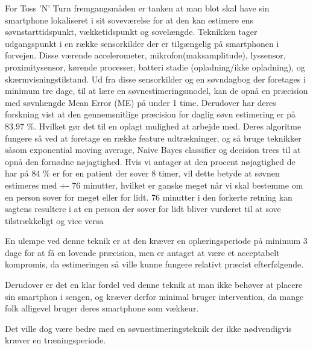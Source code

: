For Toss 'N' Turn fremgangsmåden er tanken at man blot skal have sin smartphone lokaliseret i sit soveværelse for at den kan estimere ens søvnstarttidspunkt, vækketidspunkt og sovelængde.
Teknikken tager udgangspunkt i en række sensorkilder der er tilgængelig på smartphonen i forvejen.
Disse værende accelerometer, mikrofon(maksamplitude), lyssensor, proximitysensor, kørende processer, batteri stadie (opladning/ikke opladning), og skærmvisningstilstand.
Ud fra disse sensorkilder og en søvndagbog der foretages i minimum tre dage, til at lære en søvnestimeringsmodel, kan de opnå en præcision med søvnlængde Mean Error (ME) på under 1 time.
Derudover har deres forskning vist at den gennemsnitlige præcision for daglig søvn estimering er på 83.97 \%.
Hvilket gør det til en oplagt mulighed at arbejde med.
Deres algoritme fungere så ved at foretage en række feature udtrækninger, og så bruge teknikker såsom exponential moving average, Naive Bayes classifier og decision trees til at opnå den fornødne nøjagtighed.
Hvis vi antager at den procent nøjagtighed de har på 84 \% er for en patient der sover 8 timer, vil dette betyde at søvnen estimeres med +- 76 minutter, hvilket er ganske meget når vi skal bestemme om en person sover for meget eller for lidt.
76 minutter i den forkerte retning kan sagtens resultere i at en person der sover for lidt bliver vurderet til at sove tilstrækkeligt og vice versa

En ulempe ved denne teknik er at den kræver en oplæringsperiode på minimum 3 dage for at få en lovende præcision, men er antaget at være et acceptabelt kompromis, da estimeringen så ville kunne fungere relativt præcist efterfølgende.

Derudover er det en klar fordel ved denne teknik at man ikke behøver at placere sin smartphon i sengen, og kræver derfor minimal bruger intervention, da mange folk alligevel bruger deres smartphone som vækkeur.

Det ville dog være bedre med en søvnestimeringsteknik der ikke nødvendigvis kræver en træningsperiode.

